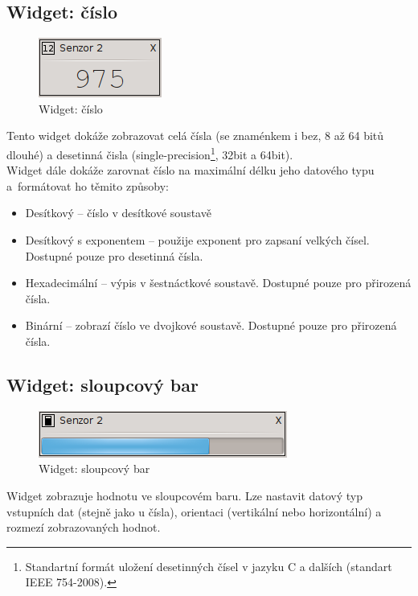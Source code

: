 \documentclass[12pt, a4paper, oneside]{article}
\begin{document}
\subsection{Widget: číslo}
\begin{figure}[h]
\begin{center}
\includegraphics{img/w_num.png}
\caption{Widget: číslo}
\end{center}
\end{figure}
Tento widget dokáže zobrazovat celá čísla (se znaménkem i bez, 8 až 64 bitů dlouhé) a desetinná čisla (single-precision\footnote{Standartní formát uložení desetinných čísel v jazyku C a dalších (standart IEEE 754-2008).}, 32bit a 64bit).\\
Widget dále dokáže zarovnat číslo na maximální délku jeho datového typu\\a~formátovat ho těmito způsoby:
\begin{itemize}
    \item Desítkový -- číslo v desítkové soustavě
    \item Desítkový s exponentem -- použije exponent pro zapsaní velkých čísel. Dostupné pouze pro desetinná čísla.
    \item Hexadecimální -- výpis v šestnáctkové soustavě. Dostupné pouze pro přirozená čísla. 
    \item Binární -- zobrazí číslo ve dvojkové soustavě.  Dostupné pouze pro přirozená čísla.
\end{itemize}


\subsection{Widget: sloupcový bar}
\begin{figure}[h]
\begin{center}
\includegraphics{img/w_bar.png}
\caption{Widget: sloupcový bar}
\end{center}
\end{figure}
Widget zobrazuje hodnotu ve sloupcovém baru. Lze nastavit datový typ vstupních dat (stejně jako u čísla), orientaci (vertikální nebo horizontální) a rozmezí zobrazovaných hodnot.
\end{document}
